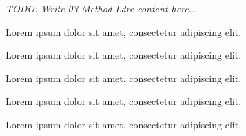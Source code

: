 \textit{TODO: Write 03 Method Ldre content here...}
\par Lorem ipsum dolor sit amet, consectetur adipiscing elit. \par Lorem ipsum dolor sit amet, consectetur adipiscing elit. \par Lorem ipsum dolor sit amet, consectetur adipiscing elit. \par Lorem ipsum dolor sit amet, consectetur adipiscing elit. \par Lorem ipsum dolor sit amet, consectetur adipiscing elit. 
